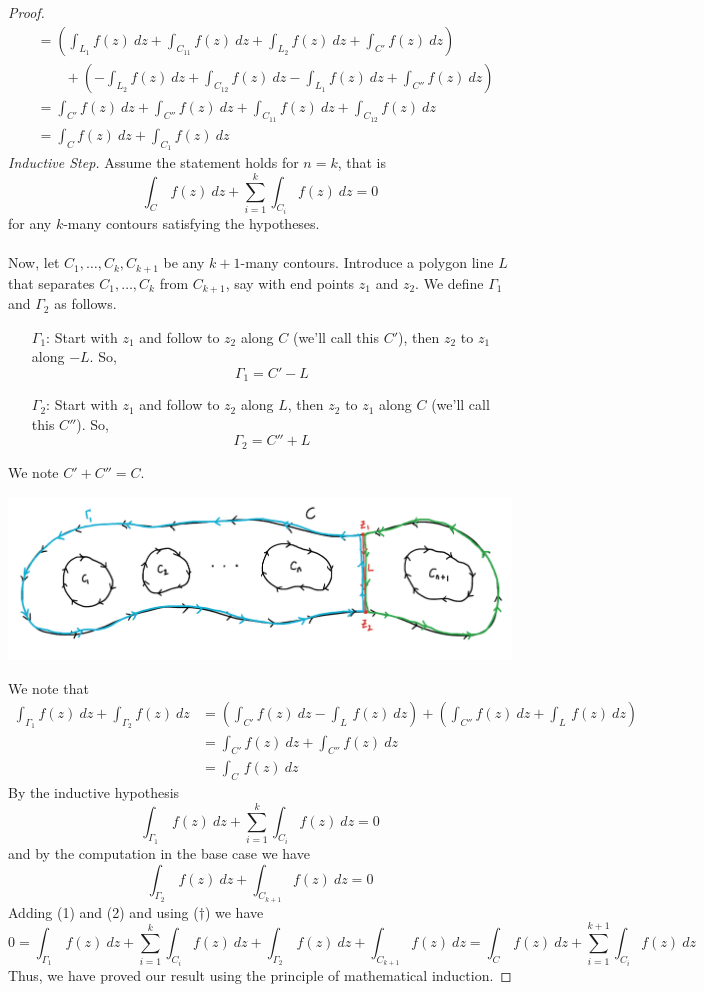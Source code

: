\begin{proof}
\begin{align*}
 &= \left(\int_{L_1}f(z)\ dz + \int_{C_{11}}f(z)\ dz + \int_{L_2}f(z)\ dz + \int_{C'}f(z)\ dz\right)\\[1em]
 &\qquad + \left(-\int_{L_2}f(z)\ dz + \int_{C_{12}}f(z)\ dz - \int_{L_1}f(z)\ dz + \int_{C''}f(z)\ dz\right)\\[1em]
 &= \int_{C'}f(z)\ dz + \int_{C''}f(z)\ dz + \int_{C_{11}}f(z)\ dz + \int_{C_{12}}f(z)\ dz\\[1em]
 &= \int_{C}f(z)\ dz + \int_{C_1}f(z)\ dz
\end{align*}
\emph{Inductive Step.} Assume the statement holds for $n = k$, that is
\[\int_C\,f(z)\ dz + \sum_{i=1}^k\int_{C_i}f(z)\ dz = 0\]
for any $k$-many contours satisfying the hypotheses.\\
\\
Now, let $C_1,\ldots,C_k,C_{k+1}$ be any $k+1$-many contours. Introduce a polygon line $L$ that separates $C_1,\ldots,C_k$ from $C_{k+1}$, say with end points $z_1$ and $z_2$. We define $\Gamma_1$ and $\Gamma_2$ as follows.
\begin{itemize}
\item[$\Gamma_1$:] Start with $z_1$ and follow to $z_2$ along $C$ (we'll call this $C'$), then $z_2$ to $z_1$ along $-L$. So, 
\[\Gamma_1 = C' - L\]
\item[$\Gamma_2$:] Start with $z_1$ and follow to $z_2$ along $L$, then $z_2$ to $z_1$ along $C$ (we'll call this $C''$). So, 
\[\Gamma_2 = C'' + L\]
\end{itemize}
We note $C' + C'' = C$.
\begin{center}
\includegraphics[scale=0.5]{Sections/Illustrations/CG-MCD-Induction.png}
\end{center}
We note that
\begin{align*}
\int_{\Gamma_1}f(z)\ dz + \int_{\Gamma_2}f(z)\ dz &= \left(\int_{C'}f(z)\ dz - \int_{L}\,f(z)\ dz\right) + \left(\int_{C''}f(z)\ dz + \int_{L}\,f(z)\ dz\right)\\[1em]
 &= \int_{C'}f(z)\ dz + \int_{C''}f(z)\ dz\\[1em]
 &= \int_C\,f(z)\ dz \tag{$\dagger$}
\end{align*}
By the inductive hypothesis
\[\int_{\Gamma_1}\,f(z)\ dz + \sum_{i=1}^k\int_{C_i}f(z)\ dz = 0\tag{1}\]
and by the computation in the base case we have
\[\int_{\Gamma_2}\,f(z)\ dz + \int_{C_{k+1}}f(z)\ dz = 0\tag{2}\]
Adding (1) and (2) and using ($\dagger$) we have
\[0 = \int_{\Gamma_1}\,f(z)\ dz + \sum_{i=1}^k\int_{C_i}f(z)\ dz + \int_{\Gamma_2}\,f(z)\ dz + \int_{C_{k+1}}f(z)\ dz = \int_C\,f(z)\ dz + \sum_{i=1}^{k+1}\int_{C_i}f(z)\ dz\]
Thus, we have proved our result using the principle of mathematical induction. 
\end{proof}

